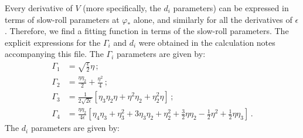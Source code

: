 \documentclass[useAMS,usenatbib,a4paper,onecolumn]{mn2e}
\begin{document}
Every derivative of $V$ (more specifically, the $d_i$ parameters) can be expressed in terms of slow-roll parameters at $\varphi_*$ alone, and similarly for all the derivatives of $\epsilon$. Therefore, we find a fitting function in terms of the slow-roll parameters. The explicit expressions for the $\Gamma_i$ and $d_i$ were obtained in the calculation notes accompanying this file. The $\Gamma_i$ parameters are given by:
\begin{align}
	\Gamma_1&=\sqrt{\frac{\epsilon}{2}}\eta\,;\\
	\Gamma_2&=\frac{\eta\eta_2}{2}+\frac{\eta^2}{4}\,;\\
	\Gamma_3&=\frac{1}{2\sqrt{2\epsilon}}\left[ \eta_3\eta_2\eta+\eta^2\eta_2+\eta_2^2\eta \right]\, ;\\
	\Gamma_4&= \frac{\eta\eta_2}{4\epsilon}\left[ \eta_4\eta_3+\eta_3^2+3\eta_3\eta_2+\eta_2^2+\frac{3}{2}\eta\eta_2 -\frac{1}{2}\eta^2+\frac{1}{2}\eta\eta_3 \right]\, .
\end{align}
The $d_i$ parameters are given by:
\end{document}
